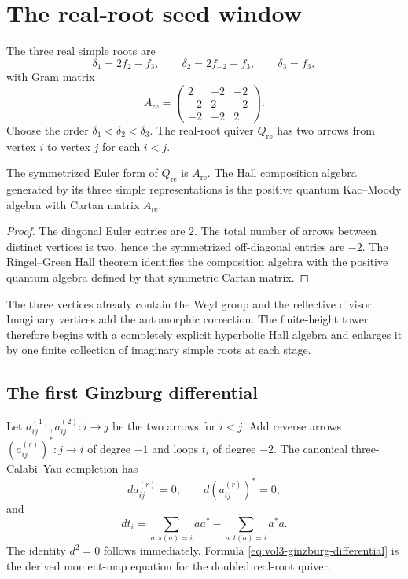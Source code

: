 \chapter{The real-root seed window}
The three real simple roots are
\[
 \delta_1=2f_2-f_3,
 \qquad
 \delta_2=2f_{-2}-f_3,
 \qquad
 \delta_3=f_3,
\]
with Gram matrix
\[
 A_{\mathrm{re}}=
 \begin{pmatrix}
 2&-2&-2\\
 -2&2&-2\\
 -2&-2&2
 \end{pmatrix}.
\]
Choose the order $\delta_1<\delta_2<\delta_3$.  The real-root quiver $Q_{\mathrm{re}}$ has two arrows from vertex $i$ to vertex $j$ for each $i<j$.

\begin{proposition}
The symmetrized Euler form of $Q_{\mathrm{re}}$ is $A_{\mathrm{re}}$.  The Hall composition algebra generated by its three simple representations is the positive quantum Kac--Moody algebra with Cartan matrix $A_{\mathrm{re}}$.
\end{proposition}
\begin{proof}
The diagonal Euler entries are $2$.  The total number of arrows between distinct vertices is two, hence the symmetrized off-diagonal entries are $-2$.  The Ringel--Green Hall theorem identifies the composition algebra with the positive quantum algebra defined by that symmetric Cartan matrix.
\end{proof}

The three vertices already contain the Weyl group and the reflective divisor.  Imaginary vertices add the automorphic correction.  The finite-height tower therefore begins with a completely explicit hyperbolic Hall algebra and enlarges it by one finite collection of imaginary simple roots at each stage.

\section{The first Ginzburg differential}
Let $a_{ij}^{(1)},a_{ij}^{(2)}:i\to j$ be the two arrows for $i<j$.  Add reverse arrows $(a_{ij}^{(r)})^*:j\to i$ of degree $-1$ and loops $t_i$ of degree $-2$.  The canonical three-Calabi--Yau completion has
\[
 d a_{ij}^{(r)}=0,
 \qquad
 d(a_{ij}^{(r)})^*=0,
\]
and
\begin{equation}\label{eq:vol3-ginzburg-differential}
 d t_i=
 \sum_{a:s(a)=i}aa^*
 -\sum_{a:t(a)=i}a^*a.
\end{equation}
The identity $d^2=0$ follows immediately.  Formula \eqref{eq:vol3-ginzburg-differential} is the derived moment-map equation for the doubled real-root quiver.

